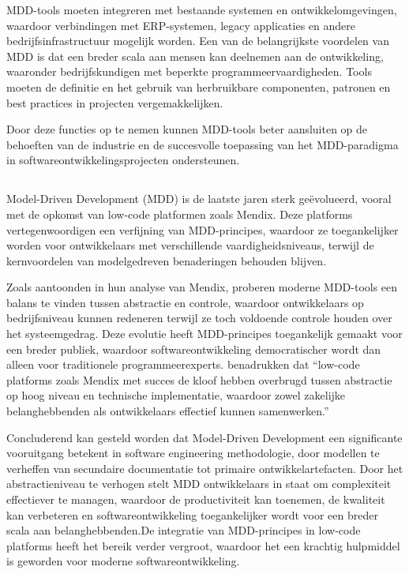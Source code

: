 MDD-tools moeten integreren met bestaande systemen en ontwikkelomgevingen, waardoor verbindingen met ERP-systemen, legacy applicaties en andere bedrijfsinfrastructuur mogelijk worden. Een van de belangrijkste voordelen van MDD is dat een breder scala aan mensen kan deelnemen aan de ontwikkeling, waaronder bedrijfskundigen met beperkte programmeervaardigheden. Tools moeten de definitie en het gebruik van herbruikbare componenten, patronen en best practices in projecten vergemakkelijken. 

Door deze functies op te nemen kunnen MDD-tools beter aansluiten op de behoeften van de industrie en de succesvolle toepassing van het MDD-paradigma in softwareontwikkelingsprojecten ondersteunen.

\subsection{}%
Model-Driven Development (MDD) is de laatste jaren sterk geëvolueerd, vooral met de opkomst van low-code platformen zoals Mendix. Deze platforms vertegenwoordigen een verfijning van MDD-principes, waardoor ze toegankelijker worden voor ontwikkelaars met verschillende vaardigheidsniveaus, terwijl de kernvoordelen van modelgedreven benaderingen behouden blijven.

Zoals \textcite{Henkel2010} aantoonden in hun analyse van Mendix, proberen moderne MDD-tools een balans te vinden tussen abstractie en controle, waardoor ontwikkelaars op bedrijfsniveau kunnen redeneren terwijl ze toch voldoende controle houden over het systeemgedrag. Deze evolutie heeft MDD-principes toegankelijk gemaakt voor een breder publiek, waardoor softwareontwikkeling democratischer wordt dan alleen voor traditionele programmeerexperts. \textcite{Henkel2010} benadrukken dat “low-code platforms zoals Mendix met succes de kloof hebben overbrugd tussen abstractie op hoog niveau en technische implementatie, waardoor zowel zakelijke belanghebbenden als ontwikkelaars effectief kunnen samenwerken.”

Concluderend kan gesteld worden dat Model-Driven Development een significante vooruitgang betekent in software engineering methodologie, door modellen te verheffen van secundaire documentatie tot primaire ontwikkelartefacten. Door het abstractieniveau te verhogen stelt MDD ontwikkelaars in staat om complexiteit effectiever te managen, waardoor de productiviteit kan toenemen, de kwaliteit kan verbeteren en softwareontwikkeling toegankelijker wordt voor een breder scala aan belanghebbenden.De integratie van MDD-principes in low-code platforms heeft het bereik verder vergroot, waardoor het een krachtig hulpmiddel is geworden voor moderne softwareontwikkeling.

